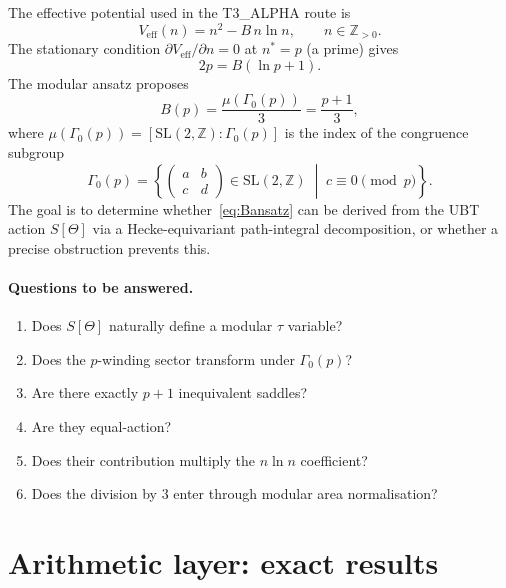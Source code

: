 \documentclass[12pt,a4paper]{article}
\theoremstyle{definition}
\theoremstyle{remark}
\newcommand{\SL}{\mathrm{SL}}
\newcommand{\ZZ}{\mathbb{Z}}
\newcommand{\Gam}{\Gamma}
\begin{document}
The effective potential used in the T3\_ALPHA route is
\begin{equation}
  V_{\mathrm{eff}}(n) = n^2 - B\,n\ln n, \qquad n\in\ZZ_{>0}.
  \label{eq:veff}
\end{equation}
The stationary condition $\partial V_{\mathrm{eff}}/\partial n=0$ at
$n^*=p$ (a prime) gives
\begin{equation}
  2p = B(\ln p + 1).
  \label{eq:stat}
\end{equation}
The modular ansatz proposes
\begin{equation}
  B(p) = \frac{\mu(\Gam_0(p))}{3} = \frac{p+1}{3},
  \label{eq:Bansatz}
\end{equation}
where $\mu(\Gam_0(p))=[\SL(2,\ZZ):\Gam_0(p)]$ is the index of the
congruence subgroup
\[
  \Gam_0(p) = \left\{\begin{pmatrix}a&b\\c&d\end{pmatrix}\in\SL(2,\ZZ)
              \;\middle|\; c\equiv 0\pmod{p}\right\}.
\]
The goal is to determine whether~\eqref{eq:Bansatz} can be derived from
the UBT action $S[\Theta]$ via a Hecke-equivariant path-integral
decomposition, or whether a precise obstruction prevents this.

\paragraph{Questions to be answered.}
\begin{enumerate}[label=Q\arabic*.]
  \item Does $S[\Theta]$ naturally define a modular $\tau$ variable?
  \item Does the $p$-winding sector transform under $\Gam_0(p)$?
  \item Are there exactly $p+1$ inequivalent saddles?
  \item Are they equal-action?
  \item Does their contribution multiply the $n\ln n$ coefficient?
  \item Does the division by $3$ enter through modular area normalisation?
\end{enumerate}

\section{Arithmetic layer: exact results}
\label{sec:arithmetic}
\end{document}
